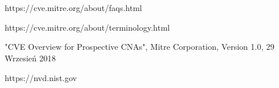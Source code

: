 \documentclass[a4paper,12pt,twoside]{article}
\begin{document}
\section*{ }

\renewcommand{\refname}{Bibliografia}
\begin{thebibliography}{}


https://cve.mitre.org/about/faqs.html

https://cve.mitre.org/about/terminology.html

"CVE Overview for Prospective CNAs", Mitre Corporation, Version 1.0, 29 Wrzesień 2018

https://nvd.nist.gov
  

\end{thebibliography}

\newpage





\end{document}
